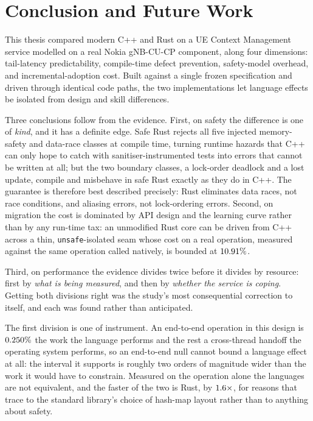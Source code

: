 \documentclass[english,twoside,openright,a4paper,censored,csm,software-track-2020]{HYthesisML}
\begin{document}
\chapter{Conclusion and Future Work\label{chapter:conclusions}}

This thesis compared modern C++ and Rust on a UE Context Management service modelled on a real
Nokia gNB-CU-CP component, along four dimensions: tail-latency predictability, compile-time
defect prevention, safety-model overhead, and incremental-adoption cost. Built against a single
frozen specification and driven through identical code paths, the two implementations let
language effects be isolated from design and skill differences.

Three conclusions follow from the evidence. First, on safety the difference is one of
\emph{kind}, and it has a definite edge. Safe Rust rejects all five injected memory-safety and
data-race classes at compile time, turning runtime hazards that C++ can only hope to catch with
sanitiser-instrumented tests into errors that cannot be written at all; but the two boundary
classes, a lock-order deadlock and a lost update, compile and misbehave in safe Rust exactly as
they do in C++. The guarantee is therefore best described precisely: Rust eliminates data
races, not race conditions, and aliasing errors, not lock-ordering errors. Second, on migration
the cost is dominated by API design and the learning curve rather than by any run-time tax: an
unmodified Rust core can be driven from C++ across a thin, \texttt{unsafe}-isolated seam whose
cost on a real operation, measured against the same operation called natively, is bounded at
$10.91\%$.

Third, on performance the evidence divides twice before it divides by resource: first by
\emph{what is being measured}, and then by \emph{whether the service is coping}. Getting both
divisions right was the study's most consequential correction to itself, and each was found rather
than anticipated.

The first division is one of instrument. An end-to-end operation in this design is
$0.250\%$ the work the language performs and the rest a cross-thread handoff the
operating system performs, so an end-to-end null cannot bound a language effect at all: the
interval it supports is roughly two orders of magnitude wider than the work it would have to
constrain. Measured on the operation alone the languages are not equivalent, and the faster of the
two is Rust, by $1.6\times$, for reasons that trace to the standard library's choice
of hash-map layout rather than to anything about safety.
\end{document}
